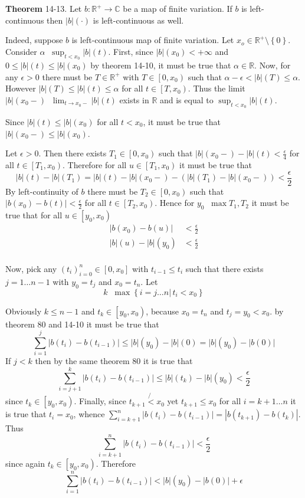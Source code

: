 \documentclass[a4paper]{article}
\newcommand{\obj}[1]{\left\{ #1 \right \}}
\newcommand{\clo}[1]{\left [ #1 \right ]}
\newcommand{\clop}[1]{\left [ #1 \right )}
\newcommand{\brac}[1]{\left ( #1 \right )}
\newcommand{\induc}[1]{\left . #1 \right \vert}
\newcommand{\abs}[1]{\left | #1 \right |}
\newcommand{\Real}{\mathbb{R}}
\newcommand{\Cplx}{\mathbb{C}}
\newcommand{\defn}{\mathop{\overset{\Delta}{=}}\nolimits}
\begin{document}
\label{thm:tot_var_left_cont}\noindent\textbf{Theorem} 14-13.
Let $b:\Real^+\to\Cplx$ be a map of finite variation. If $b$ is left-continuous then $\abs{b}\brac{\cdot}$ is left-continuous as well.

Indeed, suppose $b$ is left-continuous map of finite variation. Let $x_o\in \Real^+\setminus\obj{0}$. Consider $\alpha\defn \sup_{t<x_0} \abs{b}\brac{t}$. First, since $\abs{b}\brac{x_0}<+\infty$ and $0\leq \abs{b}\brac{t}\leq \abs{b}\brac{x_0}$ by theorem 14-10, it must be true that $\alpha\in \Real$. Now, for any $\epsilon>0$ there must be $T\in \Real^+$ with $T\in \clop{0,x_0}$ such that $\alpha-\epsilon<\abs{b}\brac{T}\leq \alpha$. However $\abs{b}\brac{T}\leq \abs{b}\brac{t}\leq \alpha$ for all $t\in \clop{T,x_0}$. Thus the limit $\abs{b}\brac{x_0-}\defn \lim_{t\to x_0-}\abs{b}\brac{t}$ exists in $\Real$ and is equal to $\sup_{t<x_0} \abs{b}\brac{t}$.

Since $\abs{b}\brac{t}\leq \abs{b}\brac{x_0}$ for all $t<x_0$, it must be true that $\abs{b}\brac{x_0-}\leq \abs{b}\brac{x_0}$.

Let $\epsilon>0$. Then there exists $T_1\in\clop{0,x_0}$ such that $\abs{b}\brac{x_0-}-\abs{b}\brac{t}<\frac{\epsilon}{4}$ for all $t\in \clop{T_1,x_0}$. Therefore for all $u\in\clop{T_1,x_0}$ it must be true that \[\abs{b}\brac{t}-\abs{b}\brac{T_1} = \abs{b}\brac{t}-\abs{b}\brac{x_0-} - \brac{\abs{b}\brac{T_1}-\abs{b}\brac{x_0-}}< \frac{\epsilon}{2}\] By left-continuity of $b$ there must be $T_2\in \clop{0,x_0}$ such that $\abs{b\brac{x_0}-b\brac{t}}<\frac{\epsilon}{2}$ for all $t\in \clop{T_2,x_0}$. Hence for $y_0\defn \max{T_1,T_2}$ it must be true that for all $u\in\clop{y_0,x_0}$ \begin{align*}\abs{b\brac{x_0}-b\brac{u}}&<\frac{\epsilon}{2}\\\abs{b}\brac{u}-\abs{b}\brac{y_0}&<\frac{\epsilon}{2}\\\end{align*}

Now, pick any $\brac{t_i}_{i=0}^n\in\clo{0,x_0}$ with $t_{i-1}\leq t_i$ such that there exists $j=1\ldots{n-1}$ with $y_0=t_j$ and $x_0=t_n$. Let \[k\defn\max\obj{\induc{i=j\ldots n}\,t_i<x_0}\]

Obviously $k\leq {n-1}$ and $t_k\in \clop{y_0,x_0}$, because $x_0=t_n$ and $t_j=y_0<x_0$. by theorem 80 and 14-10 it must be true that \[\sum_{i=1}^j\abs{b\brac{t_i}-b\brac{t_{i-1}}}\leq \abs{b}\brac{y_0}-\abs{b}\brac{0}=\abs{b}\brac{y_0}-\abs{b\brac{0}}\] If $j<k$ then by the same theorem 80 it is true that \[\sum_{i=j+1}^k \abs{b\brac{t_i}-b\brac{t_{i-1}}}\leq \abs{b}\brac{t_k}-\abs{b}\brac{y_0}<\frac{\epsilon}{2}\] since $t_k\in \clop{y_0,x_0}$. Finally, since $t_{k+1}\not{<}x_0$ yet $t_{k+1}\leq x_0$ for all $i={k+1}\ldots n$ it is true that $t_i=x_0$, whence $\sum_{i=k+1}^n\abs{b\brac{t_i}-b\brac{t_{i-1}}}=\abs{b\brac{t_{k+1}}-b\brac{t_k}}$. Thus \[\sum_{i=k+1}^n\abs{b\brac{t_i}-b\brac{t_{i-1}}}<\frac{\epsilon}{2}\] since again $t_k\in \clop{y_0,x_0}$. Therefore \[\sum_{i=1}^n\abs{b\brac{t_i}-b\brac{t_{i-1}}}<\abs{b}\brac{y_0}-\abs{b\brac{0}} + \epsilon\]
\end{document}
